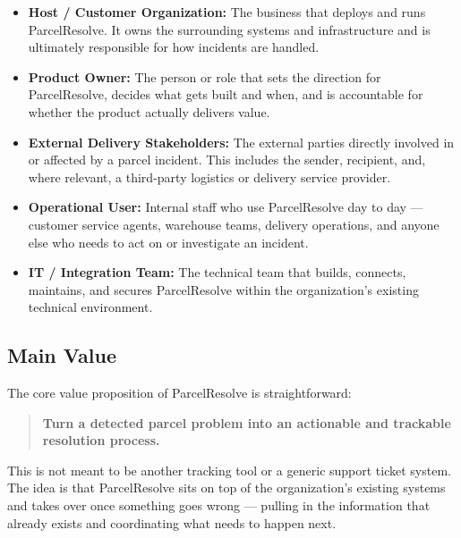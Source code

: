 \documentclass[11pt,a4paper]{article}
\begin{document}
\begin{itemize}

    \item \textbf{Host / Customer Organization:}
    The business that deploys and runs ParcelResolve. It owns the
    surrounding systems and infrastructure and is ultimately
    responsible for how incidents are handled.

    \item \textbf{Product Owner:}
    The person or role that sets the direction for ParcelResolve,
    decides what gets built and when, and is accountable for whether
    the product actually delivers value.

    \item \textbf{External Delivery Stakeholders:}
    The external parties directly involved in or affected by a parcel
    incident. This includes the sender, recipient, and, where relevant,
    a third-party logistics or delivery service provider.

    \item \textbf{Operational User:}
    Internal staff who use ParcelResolve day to day --- customer
    service agents, warehouse teams, delivery operations, and anyone
    else who needs to act on or investigate an incident.

    \item \textbf{IT / Integration Team:}
    The technical team that builds, connects, maintains, and secures
    ParcelResolve within the organization's existing technical
    environment.

\end{itemize}


\subsection{Main Value}

The core value proposition of ParcelResolve is straightforward:

\begin{quote}
\textbf{Turn a detected parcel problem into an actionable and
trackable resolution process.}
\end{quote}

This is not meant to be another tracking tool or a generic support
ticket system. The idea is that ParcelResolve sits on top of the
organization's existing systems and takes over once something goes
wrong --- pulling in the information that already exists and
coordinating what needs to happen next.
\end{document}
